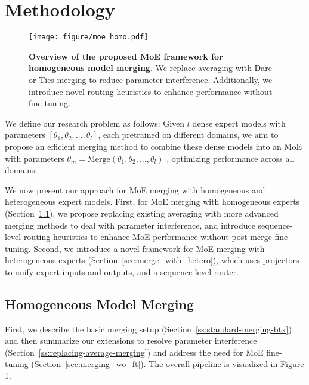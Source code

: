 \section{Methodology}


\begin{figure}[!t]
     \centering
     \texttt{[image: figure/moe\_homo.pdf]}
     \caption{\textbf{Overview of the proposed MoE framework for homogeneous model merging}. We replace averaging with Dare or Ties merging to reduce parameter interference. Additionally, we introduce novel routing heuristics to enhance performance without fine-tuning.}
     \label{fig:moe_homo}
\end{figure}

We define our research problem as follows: Given $l$ dense expert models with parameters $[\theta_1, \theta_2, \dots, \theta_l]$, each pretrained on different domains, we aim to propose an efficient merging method to combine these dense models into an MoE with parameters $\theta_m = \text{Merge}(\theta_1, \theta_2, \dots, \theta_l)$ , optimizing performance across all domains.

We now present our approach for MoE merging with homogeneous and heterogeneous expert models. 
First, for MoE merging with homogeneous experts (Section~\ref{s:homogeneous-model-merging}), we propose replacing existing averaging with more advanced merging methods to deal with parameter interference, and introduce sequence-level routing heuristics to enhance MoE performance without post-merge fine-tuning.
Second, we introduce a novel framework for MoE merging with heterogeneous experts (Section~\ref{sec:merge_with_hetero}), which uses projectors to unify expert inputs and outputs, and a sequence-level router. 

\subsection{Homogeneous Model Merging}
\label{s:homogeneous-model-merging}

First, we describe the basic merging setup (Section~\ref{ss:standard-merging-btx}) and then summarize our extensions to resolve parameter interference (Section~\ref{ss:replacing-average-merging}) and address the need for MoE fine-tuning (Section~\ref{sec:merging_wo_ft}). The overall pipeline is visualized in Figure \ref{fig:moe_homo}. 


